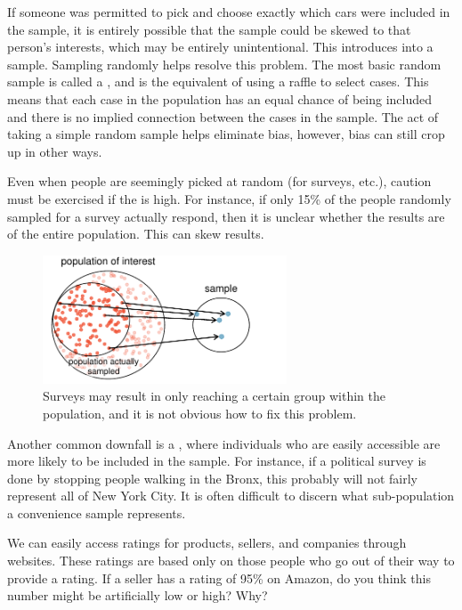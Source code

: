 If someone was permitted to pick and choose exactly which cars were included in the sample, it is entirely possible that the sample could be skewed to that person's interests, which may be entirely unintentional. This introduces  into a sample. Sampling randomly helps resolve this problem. The most basic random sample is called a , and is the equivalent of using a raffle to select cases. This means that each case in the population has an equal chance of being included and there is no implied connection between the cases in the sample. The act of taking a simple random sample helps eliminate bias, however, bias can still crop up in other ways.

Even when people are seemingly picked at random (for surveys, etc.), caution must be exercised if the  is high. For instance, if only 15\% of the people randomly sampled for a survey actually respond, then it is unclear whether the results are  of the entire population. This  can skew results.
\begin{figure}[h]
\centering
\includegraphics[height=1.5in]{01/figures/popToSample/surveySample}
\caption{Surveys may result in only reaching a certain group within the population, and it is not obvious how to fix this problem.}
\label{surveySample}
\end{figure}

Another common downfall is a , where individuals who are easily accessible are more likely to be included in the sample. For instance, if a political survey is done by stopping people walking in the Bronx, this probably will not fairly represent all of New York City. It is often difficult to discern what sub-population a convenience sample represents.

\begin{exercise}
We can easily access ratings for products, sellers, and companies through websites. These ratings are based only on those people who go out of their way to provide a rating. If a seller has a rating of 95\% on Amazon, do you think this number might be artificially low or high? Why?
\end{exercise}

